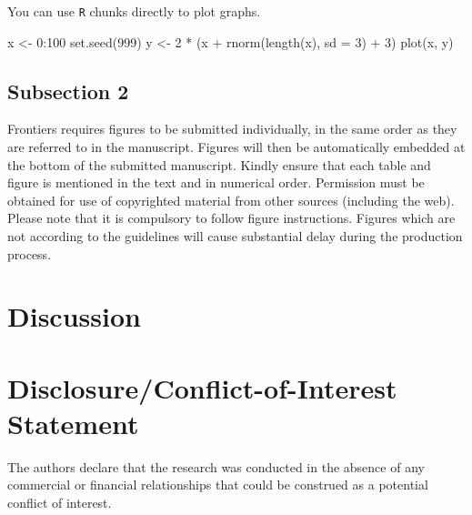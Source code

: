 \documentclass[utf8]{frontiersSCNS}
\newenvironment{Shaded}{\begin{snugshade}}{\end{snugshade}}
\newcommand{\AttributeTok}[1]{\textcolor[rgb]{0.77,0.63,0.00}{#1}}
\newcommand{\DecValTok}[1]{\textcolor[rgb]{0.00,0.00,0.81}{#1}}
\newcommand{\FunctionTok}[1]{\textcolor[rgb]{0.00,0.00,0.00}{#1}}
\newcommand{\NormalTok}[1]{#1}
\newcommand{\OtherTok}[1]{\textcolor[rgb]{0.56,0.35,0.01}{#1}}
\newcommand{\SpecialCharTok}[1]{\textcolor[rgb]{0.00,0.00,0.00}{#1}}
\begin{document}
You can use \texttt{R} chunks directly to plot graphs.

\begin{Shaded}
\begin{Highlighting}[]
\NormalTok{x }\OtherTok{\textless{}{-}} \DecValTok{0}\SpecialCharTok{:}\DecValTok{100}
\FunctionTok{set.seed}\NormalTok{(}\DecValTok{999}\NormalTok{)}
\NormalTok{y }\OtherTok{\textless{}{-}} \DecValTok{2} \SpecialCharTok{*}\NormalTok{ (x }\SpecialCharTok{+} \FunctionTok{rnorm}\NormalTok{(}\FunctionTok{length}\NormalTok{(x), }\AttributeTok{sd =} \DecValTok{3}\NormalTok{) }\SpecialCharTok{+} \DecValTok{3}\NormalTok{)}
\FunctionTok{plot}\NormalTok{(x, y)}
\end{Highlighting}
\end{Shaded}

\hypertarget{subsection-2}{%
\subsection*{Subsection 2}\label{subsection-2}}

Frontiers requires figures to be submitted individually, in the same
order as they are referred to in the manuscript. Figures will then be
automatically embedded at the bottom of the submitted manuscript. Kindly
ensure that each table and figure is mentioned in the text and in
numerical order. Permission must be obtained for use of copyrighted
material from other sources (including the web). Please note that it is
compulsory to follow figure instructions. Figures which are not
according to the guidelines will cause substantial delay during the
production process.

\hypertarget{discussion}{%
\section{Discussion}\label{discussion}}

\hypertarget{disclosureconflict-of-interest-statement}{%
\section*{Disclosure/Conflict-of-Interest
Statement}\label{disclosureconflict-of-interest-statement}}

The authors declare that the research was conducted in the absence of
any commercial or financial relationships that could be construed as a
potential conflict of interest.
\end{document}
